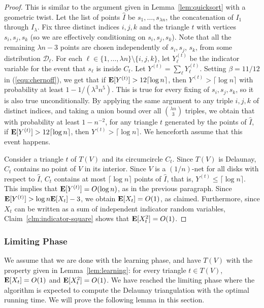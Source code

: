 \documentclass{siamltex}
\newcommand{\D}{\mathcal{D}}
\newcommand{\EX}{\hbox{\bf E}}
\begin{document}
\begin{proof} This is similar to the argument
given in Lemma~\ref{lem:quicksort} with a geometric twist.
Let the list of points $\hat I$
be $s_1, \ldots, s_{\lambda n}$, the concatenation of $I_1$ through 
$I_\lambda$.
Fix three distinct indices $i,j,k$ and 
the triangle $t$ with vertices
$s_i, s_j, s_k$ (so we are effectively conditioning on $s_i, s_j, s_k$). Note
that all the remaining $\lambda n-3$ points are chosen independently
of $s_i, s_j$, $s_k$, from some distribution $\D_\ell$. For
each $\ell \in \{1,\ldots, \lambda n\} \setminus \{i,j,k\}$, let 
$Y^{(t)}_\ell$ be the indicator variable
for the event that $s_\ell$ is inside $C_t$. Let 
$Y^{(t)} = \sum_\ell Y^{(t)}_\ell$.
Setting $\beta = 11/12$ in (\ref{equ:chernoff}),
we get that
if $\EX[Y^{(t)}] > 12\lceil\log n\rceil$,
then $Y^{(t)} > \lceil\log n\rceil$
with probability at least $1 - 1/(\lambda^3 n^{5})$.
This is true for every fixing of $s_i,s_j,s_k$, so
it is also true unconditionally.
By applying the same argument to any triple $i,j,k$ of
distinct indices, and taking a union bound over all
$\binom{\lambda n}{3}$ triples,
we obtain that
with probability at least $1 - n^{-2}$, for any triangle
$t$ generated by the points of $\hat I$, if 
$\EX[Y^{(t)}] > 12\lceil\log n\rceil$,
then $Y^{(t)} > \lceil\log n\rceil$. We henceforth assume that this
event happens.

Consider a triangle $t$ of $T(V)$ and its circumcircle $C_t$.
Since $T(V)$ is Delaunay, $C_t$ contains no point of $V$
in its interior. Since $V$ is a $(1/n)$-net for all disks with
respect to $\hat I$, $C_t$ contains at most $\lceil\log n\rceil$ points
of $\hat I$, that is, $Y^{(t)}\le \lceil\log n\rceil$.
This implies that $\EX[Y^{(t)}] = O(\log n)$, as in the previous paragraph.
Since $\EX[Y^{(t)}] > \log n \EX[X_t]-3$, we obtain $\EX[X_t] = O(1)$,
as claimed. Furthermore, since $X_t$ can be written as a sum of independent 
indicator random variables, Claim~\ref{clm:indicator-square}
shows that $\EX[X_t^2] = O(1)$. 
\end{proof}

\subsubsection{Limiting Phase} \label{sec:lim}

We assume that we are done with the learning phase, and have $T(V)$
with the property given in Lemma~\ref{lem:learning}: for
every triangle $t \in T(V)$, $\EX[X_t] = O(1)$ and $\EX[X_t^2] = O(1)$. We have reached
the limiting phase where the algorithm is expected
to compute the Delaunay triangulation with the optimal running
time. We will prove the following lemma in this section.
\medskip
\end{document}
